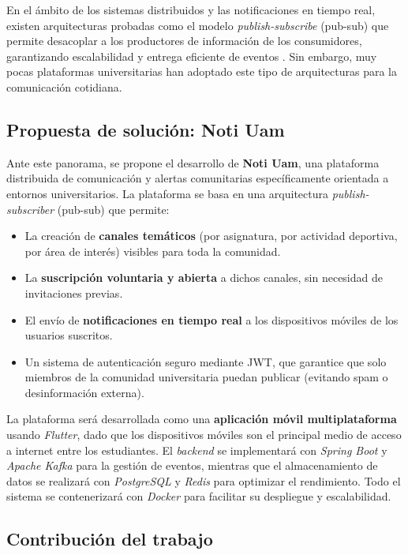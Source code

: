 En el ámbito de los sistemas distribuidos y las notificaciones en tiempo real, existen arquitecturas probadas como el modelo \textit{publish-subscribe} (pub-sub) que permite desacoplar a los productores de información de los consumidores, garantizando escalabilidad y entrega eficiente de eventos \cite{tarkoma2012publish, tanenbaum2023distributed}. Sin embargo, muy pocas plataformas universitarias han adoptado este tipo de arquitecturas para la comunicación cotidiana.

\subsection{Propuesta de solución: Noti Uam}

Ante este panorama, se propone el desarrollo de \textbf{Noti Uam}, una plataforma distribuida de comunicación y alertas comunitarias específicamente orientada a entornos universitarios. La plataforma se basa en una arquitectura \textit{publish-subscriber} (pub-sub) que permite:

\begin{itemize}[leftmargin=*]
    \item La creación de \textbf{canales temáticos} (por asignatura, por actividad deportiva, por área de interés) visibles para toda la comunidad.
    \item La \textbf{suscripción voluntaria y abierta} a dichos canales, sin necesidad de invitaciones previas.
    \item El envío de \textbf{notificaciones en tiempo real} a los dispositivos móviles de los usuarios suscritos.
    \item Un sistema de autenticación seguro mediante JWT, que garantice que solo miembros de la comunidad universitaria puedan publicar (evitando spam o desinformación externa).
\end{itemize}

La plataforma será desarrollada como una \textbf{aplicación móvil multiplataforma} usando \textit{Flutter}, dado que los dispositivos móviles son el principal medio de acceso a internet entre los estudiantes. El \textit{backend} se implementará con \textit{Spring Boot} y \textit{Apache Kafka} para la gestión de eventos, mientras que el almacenamiento de datos se realizará con \textit{PostgreSQL} y \textit{Redis} para optimizar el rendimiento. Todo el sistema se contenerizará con \textit{Docker} para facilitar su despliegue y escalabilidad.

\subsection{Contribución del trabajo}

